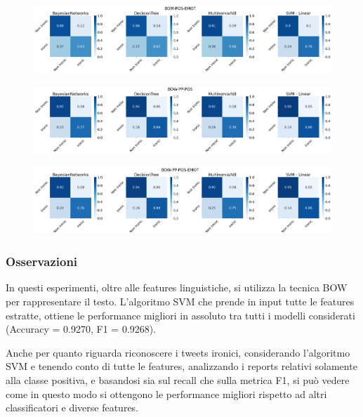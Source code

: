 \documentclass[oneside]{book}
\begin{document}
\begin{figure}[H]
	\centering
	\includegraphics[width=13cm]{assets/reports/conf-matrix/bow/bow-pos-emot.png}
\end{figure}
\vspace*{-0.8cm}

\begin{figure}[H]
	\centering
	\includegraphics[width=13cm]{assets/reports/conf-matrix/bow/bow-pp-pos.png}
\end{figure}
\vspace*{-0.8cm}

\begin{figure}[H]
	\centering
	\includegraphics[width=13cm]{assets/reports/conf-matrix/bow/bow-pp-pos-emot.png}
\end{figure}
\vspace*{-0.8cm}
\restoregeometry
\newpage
\subsubsection{Osservazioni}
In questi esperimenti, oltre alle features linguistiche, si utilizza la tecnica BOW per rappresentare il testo. L'algoritmo SVM che prende in input tutte le features estratte, ottiene le performance migliori in assoluto tra tutti i modelli considerati (Accuracy = 0.9270, F1 = 0.9268).

Anche per quanto riguarda riconoscere i tweets ironici, considerando l'algoritmo SVM e tenendo conto di tutte le features, analizzando i reports relativi solamente alla classe positiva, e basandosi sia sul recall che sulla metrica F1, si può vedere come in questo modo si ottengono le performance migliori rispetto ad altri classificatori e diverse features.
\end{document}
